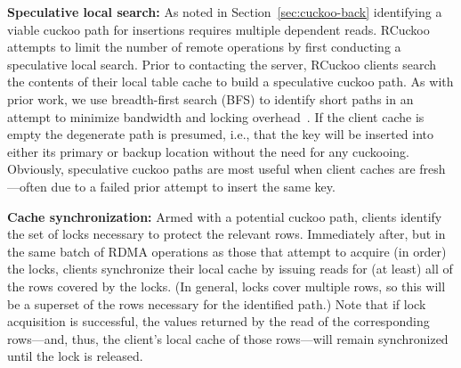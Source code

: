 \textbf{Speculative local search:} As noted in
Section~\ref{sec:cuckoo-back} identifying a viable cuckoo path for
insertions requires multiple dependent reads.  RCuckoo attempts to
limit the number of remote operations by first conducting a
speculative local search. Prior to contacting the server, RCuckoo
clients search the contents of their local table cache to build a
speculative cuckoo path.  As with prior work, we use breadth-first
search (BFS) to identify short paths in an attempt to minimize
bandwidth and locking overhead~\cite{cuckoo-improvements}.  If the
client cache is empty the degenerate path is presumed, i.e., that the
key will be inserted into either its primary or backup location
without the need for any cuckooing.  Obviously, speculative cuckoo
paths are most useful when client caches are fresh---often due to a
failed prior attempt to insert the same key.


\textbf{Cache synchronization:} Armed with a potential cuckoo path,
clients identify the set of locks necessary to protect the relevant
rows.  Immediately after, but in the same batch of RDMA operations as
those that attempt to acquire (in order) the locks, clients
synchronize their local cache by issuing reads for (at least) all of
the rows covered by the locks.  (In general, locks cover multiple
rows, so this will be a superset of the rows necessary for the
identified path.)  Note that if lock acquisition is successful, the
values returned by the read of the corresponding rows---and, thus, the
client's local cache of those rows---will remain synchronized until
the lock is released.

